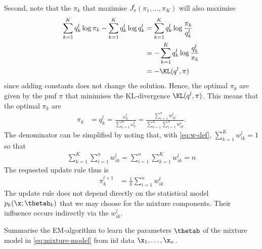 \begin{exenumerate}
\begin{solution}
    Second, note that the $\pi_k$ that maximise $J_\pi^l(\pi_1, \ldots,
    \pi_K)$ will also maximise
    \begin{align}
      \sum_{k=1}^K q_k^l \log \pi_k - \sum_{k=1}^K q_k^l \log q_k^l & = \sum_{k=1}^K q_k^l\log \frac{\pi_k}{q_k^l}\\
                                                                    & = -\sum_{k=1}^K q_k^l \log \frac{q_k^l}{\pi_k}\\
                                                                    & = -\KL(q^l, \pi)
    \end{align}
    since adding constants does not change the solution. Hence, the
    optimal $\pi_k$ are given by the pmf $\pi$ that minimises the KL-divergence
    $\KL(q^l, \pi)$. This means that the optimal $\pi_k$ are
    \begin{align}
      \pi_k & = q_k^l= \frac{\omega_k^l}{\sum_{k=1}^K \omega_{k}^l} = \frac{\sum_{i=1}^n w_{ik}^l}{\sum_{k=1}^K \sum_{i=1}^n w_{ik}^l }.
    \end{align}
    The denominator can be simplified by noting that, with \eqref{eq:w-def},
    $\sum_{k=1}^K w_{ik}^l=1$ so that
    \begin{align}
      \sum_{k=1}^K \sum_{i=1}^n w_{ik}^l = \sum_{i=1}^n \sum_{k=1}^K w_{ik}^l = n
    \end{align}   
    The requested update rule thus is
    \begin{align}
      \pi_k^{l+1} &=  \frac{1}{n}\sum_{i=1}^n w_{ik}^l
    \end{align}
    The update rule does not depend directly on the statistical model $p_k(\x;
    \thetab_k)$ that we may choose for the mixture components. Their influence
    occurs indirectly via the $w_{ik}^l$.
  \end{solution}

\item \label{ex:EM-mixture-models-summary} Summarise the EM-algorithm to learn the parameters $\thetab$ of the
  mixture model in \eqref{eq:mixture-model} from iid data $\x_1, \ldots, \x_n$.


\end{exenumerate}
